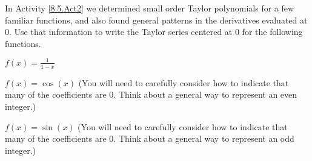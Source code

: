 \begin{activity} \label{8.5.Act2b} In Activity \ref{8.5.Act2} we determined small order Taylor polynomials for a few familiar functions, and also found general patterns in the derivatives evaluated at 0. Use that information to write the Taylor series centered at 0 for the following functions.
\ba
\item $f(x) = \frac{1}{1-x}$
 
\item $f(x) = \cos(x)$ (You will need to carefully consider how to indicate that many of the coefficients are 0. Think about a general way to represent an even integer.)
 
\item $f(x) = \sin(x)$  (You will need to carefully consider how to indicate that many of the coefficients are 0. Think about a general way to represent an odd integer.)
 
\ea

\end{activity}

